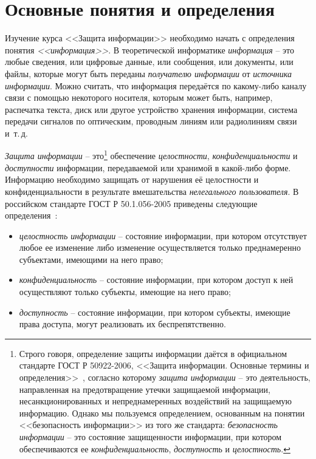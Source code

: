 \chapter{Основные понятия и определения}

Изучение курса <<Защита информации>> необходимо начать с определения понятия \emph{<<информация>>}. В теоретической информатике \emph{информация} -- это любые сведения, или цифровые данные, или сообщения, или документы, или файлы, которые могут быть переданы \emph{получателю информации} от \emph{источника информации}. Можно считать, что информация передаётся по какому-либо каналу связи с помощью некоторого носителя, которым может быть, например, распечатка текста, диск или другое устройство хранения информации, система передачи сигналов по оптическим, проводным линиям или радиолиниям связи и~т.\,д.

\emph{Защита информации} -- это\footnote{Строго говоря, определение защиты информации даётся в официальном стандарте ГОСТ Р 50922-2006, <<Защита информации. Основные термины и определения>>~\cite{GOST-50922-2006}, согласно которому \emph{защита информации} -- это деятельность, направленная на предотвращение утечки защищаемой информации, несанкционированных и непреднамеренных воздействий на защищаемую информацию. Однако мы пользуемся определением, основанным на понятии <<безопасность информации>> из того же стандарта: \emph{безопасность информации} -- это состояние защищенности информации, при котором обеспечиваются ее \emph{конфиденциальность}, \emph{доступность} и \emph{целостность}.} обеспечение \emph{целостности}, \emph{конфиденциальности} и \emph{доступности} информации, передаваемой или хранимой в какой-либо форме. Информацию необходимо защищать от нарушения её целостности и конфиденциальности в результате вмешательства \emph{нелегального пользователя}. В российском стандарте ГОСТ Р 50.1.056-2005 приведены следующие определения~\cite{GOST-2005}:
\begin{itemize}
	\item \emph{целостность информации} -- состояние информации, при котором отсутствует любое ее изменение либо изменение осуществляется только преднамеренно субъектами, имеющими на него право;
	\item \emph{конфиденциальность} -- состояние информации, при котором доступ к ней осуществляют только субъекты, имеющие на него право;
	\item \emph{доступность} -- состояние информации, при котором субъекты, имеющие права доступа, могут реализовать их беспрепятственно.
\end{itemize}

